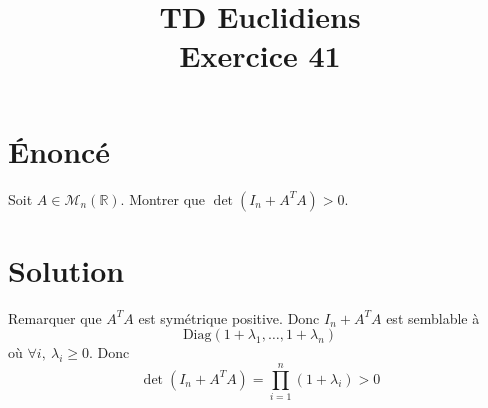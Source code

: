 \documentclass[french]{article}
\title{TD Euclidiens\\ Exercice 41}
\date{}
\newcommand{\R}{\mathbb{R}}
\begin{document}
\maketitle

\section{Énoncé}
Soit $A\in\mathcal{M}_n(\R)$. Montrer que $\det(I_n+A^TA)>0$.
\section{Solution}
Remarquer que $A^TA$ est symétrique positive. Donc $I_n+A^TA$ est semblable à $$\text{Diag}(1+\lambda_1,\ldots,1+\lambda_n)$$ où $\forall i,\ \lambda_i\geqslant 0$. Donc $$\det(I_n+A^TA)=\prod_{i=1}^{n}(1+\lambda_i)>0$$
\end{document}
